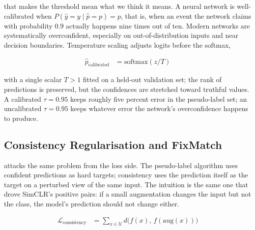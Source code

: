  that makes the threshold mean what we think it means.
A neural network is well-calibrated when $P(\hat{y} = y \mid \hat{p} = p) = p$, that is, when an event the network claims with probability $0.9$ actually happens nine times out of ten.
Modern networks are systematically overconfident, especially on out-of-distribution inputs and near decision boundaries\cite{Guo2017Calibration}.
Temperature scaling adjusts logits before the softmax,

\begin{align*}
    \hat{p}_{\text{calibrated}} &= \mathrm{softmax}(z / T)
\end{align*}

with a single scalar $T > 1$ fitted on a held-out validation set; the rank of predictions is preserved, but the confidences are stretched toward truthful values.
A calibrated $\tau{=}0.95$ keeps roughly five percent error in the pseudo-label set; an uncalibrated $\tau{=}0.95$ keeps whatever error the network's overconfidence happens to produce.



\subsection{Consistency Regularisation and FixMatch}


 attacks the same problem from the loss side.
The pseudo-label algorithm uses confident predictions as hard targets; consistency uses the prediction itself as the target on a perturbed view of the same input.
The intuition is the same one that drove SimCLR's positive pairs: if a small augmentation changes the input but not the class, the model's prediction should not change either.

\begin{align*}
    \mathcal{L}_{\text{consistency}} &= \sum_{x \in \mathcal{U}} d\bigl(f(x),\, f(\mathrm{aug}(x))\bigr)
\end{align*}

